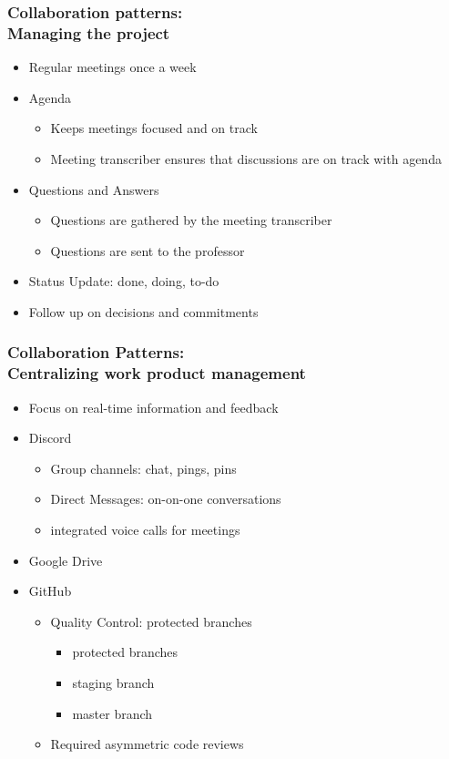 \documentclass{beamer}
\begin{document}
\begin{frame}
\frametitle{Collaboration patterns:\\ Managing the project}
\begin{itemize}
 \item Regular meetings once a week
 \item Agenda
   \begin{itemize}
   \item Keeps meetings focused and on track
   \item Meeting transcriber ensures that discussions are on track with agenda
   \end{itemize}
 \item Questions and Answers
    \begin{itemize}
   \item Questions are gathered by the meeting transcriber
   \item Questions are sent to the professor
   \end{itemize}
 \item Status Update: done, doing, to-do
 \item Follow up on decisions and commitments
\end{itemize}
\end{frame}

\begin{frame}
\frametitle{Collaboration Patterns: \\ Centralizing work product management}
\begin{itemize}
 \item Focus on real-time information and feedback
 \item Discord
  \begin{itemize}
   \item Group channels: chat, pings, pins
   \item Direct Messages: on-on-one conversations
   \item integrated voice calls for meetings
  \end{itemize}
 \item Google Drive
 \item GitHub
  \begin{itemize}
   \item Quality Control: protected branches
     \begin{itemize}
        \item protected branches
        \item staging branch
        \item master branch
    \end{itemize}
   \item Required asymmetric code reviews
  \end{itemize}
\end{itemize}
\end{frame}
\end{document}
